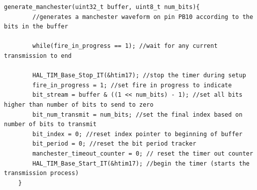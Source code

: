 \begin{lstlisting}[style=cstyle, caption=Generate Manchester Function Implementation, label=lst:generate_manchester_implementation]
	generate_manchester(uint32_t buffer, uint8_t num_bits){
		//generates a manchester waveform on pin PB10 according to the bits in the buffer
		
		while(fire_in_progress == 1); //wait for any current transmission to end
		
		HAL_TIM_Base_Stop_IT(&htim17); //stop the timer during setup
		fire_in_progress = 1; //set fire in progress to indicate
		bit_stream = buffer & ((1 << num_bits) - 1); //set all bits higher than number of bits to send to zero
		bit_num_transmit = num_bits; //set the final index based on number of bits to transmit
		bit_index = 0; //reset index pointer to beginning of buffer
		bit_period = 0; //reset the bit period tracker
		manchester_timeout_counter = 0; // reset the timer out counter
		HAL_TIM_Base_Start_IT(&htim17); //begin the timer (starts the transmission process)
	}
\end{lstlisting}


